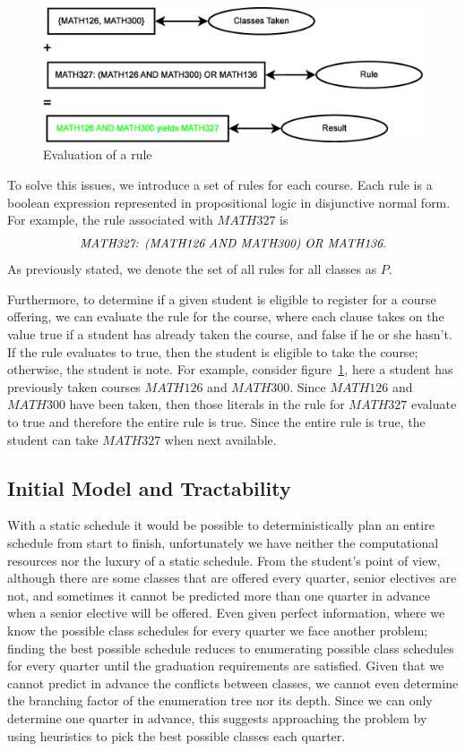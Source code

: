 \documentclass[11pt]{article} %
\begin{document}
\begin{figure} [ht]
    \begin{center}
        \includegraphics[scale=0.4]{prereq_logic_example}
    \end{center}
    \caption{Evaluation of a rule}
    \label{logic_ex}
\end{figure}

To solve this issues, we introduce a set of rules for each course. Each rule is
a boolean expression represented in propositional logic in disjunctive normal
form. For example, the rule associated with $MATH327$ is $$ \text{{\it MATH327:
(MATH126 AND MATH300) OR MATH136}}.  $$ As previously stated, we denote the set
of all rules for all classes as $P$.

Furthermore, to determine if a given student is eligible to register for
a course offering, we can evaluate the rule for the course, where each clause
takes on the value true if a student has already taken the course, and false if
he or she hasn't. If the rule evaluates to true, then the student is eligible to
take the course; otherwise, the student is note. For example, consider
figure~\ref{logic_ex}, here a student has previously taken courses $MATH126$ and
$MATH300$. Since $MATH126$ and $MATH300$ have been taken, then those literals in
the rule for $MATH327$ evaluate to true and therefore the entire rule is true.
Since the entire rule is true, the student can take $MATH327$ when next
available.

\subsection{Initial Model and Tractability} With a static schedule it would be
possible to deterministically plan an entire schedule from start to finish,
unfortunately we have neither the computational resources nor the luxury of
a static schedule. From the student’s point of view, although there are some
classes that are offered every quarter, senior electives are not, and sometimes
it cannot be predicted more than one quarter in advance when a senior elective
will be offered. Even given perfect information, where we know the possible
class schedules for every quarter we face another problem; finding the best
possible schedule reduces to enumerating possible class schedules for every
quarter until the graduation requirements are satisfied. Given that we cannot
predict in advance the conflicts between classes, we cannot even determine the
branching factor of the enumeration tree nor its depth. Since we can only
determine one quarter in advance, this suggests approaching the problem by using
heuristics to pick the best possible classes each quarter.
\end{document}

